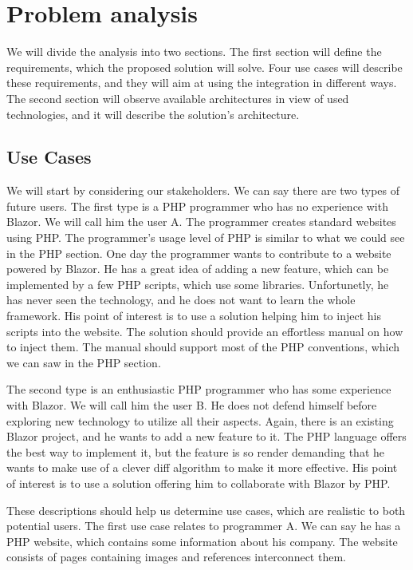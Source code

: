 \chapter{Problem analysis}

We will divide the analysis into two sections.
The first section will define the requirements, which the proposed solution will solve.
Four use cases will describe these requirements, and they will aim at using the integration in different ways.
The second section will observe available architectures in view of used technologies, and it will describe the solution's architecture.

\section{Use Cases}
We will start by considering our stakeholders.
We can say there are two types of future users.
The first type is a PHP programmer who has no experience with Blazor.
We will call him the user A.
The programmer creates standard websites using PHP.
The programmer's usage level of PHP is similar to what we could see in the PHP section. 
One day the programmer wants to contribute to a website powered by Blazor.
He has a great idea of adding a new feature, which can be implemented by a few PHP scripts, which use some libraries.
Unfortunetly, he has never seen the technology, and he does not want to learn the whole framework.
His point of interest is to use a solution helping him to inject his scripts into the website.
The solution should provide an effortless manual on how to inject them.
The manual should support most of the PHP conventions, which we can saw in the PHP section.
\par
The second type is an enthusiastic PHP programmer who has some experience with Blazor.
We will call him the user B.
He does not defend himself before exploring new technology to utilize all their aspects.
Again, there is an existing Blazor project, and he wants to add a new feature to it.
The PHP language offers the best way to implement it, but the feature is so render demanding that he wants to make use of a clever diff algorithm to make it more effective.
His point of interest is to use a solution offering him to collaborate with Blazor by PHP.
\par
These descriptions should help us determine use cases, which are realistic to both potential users.
The first use case relates to programmer A.
We can say he has a PHP website, which contains some information about his company.
The website consists of pages containing images and references interconnect them.
